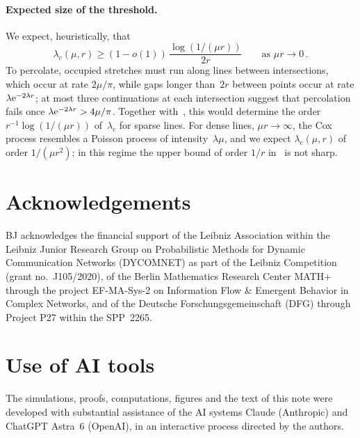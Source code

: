 \documentclass[11pt,letterpaper]{article}
\begin{document}
\paragraph{Expected size of the threshold.} We expect, heuristically, that
\begin{equation*}
  \lambda_c(\mu,r)\ge(1-o(1))\,\frac{\log(1/(\mu r))}{2r}\qquad\text{as }\mu r\to0\,.
\end{equation*} To percolate, occupied stretches must run along lines between intersections, which occur at rate $2\mu/\pi$, while gaps longer than~$2r$ between points occur at rate $\lambda\mathrm{e}^{-2\lambda r}$; at most three continuations at each intersection suggest that percolation fails once $\lambda\mathrm{e}^{-2\lambda r}>4\mu/\pi$. Together with~\cite[Theorem~2.1]{HJ26}, this would determine the order $r^{-1}\log(1/(\mu r))$ of~$\lambda_c$ for sparse lines. For dense lines, $\mu r\to\infty$, the Cox process resembles a Poisson process of intensity~$\lambda\mu$, and we expect $\lambda_c(\mu,r)$ of order $1/(\mu r^2)$; in this regime the upper bound of order $1/r$ in~\cite{HJ26} is not sharp.

\begin{samepage}
\section*{Acknowledgements}

BJ acknowledges the financial support of the Leibniz Association within the Leibniz Junior Research Group on Probabilistic Methods for Dynamic Communication Networks (DYCOMNET) as part of the Leibniz Competition (grant no.~J105/2020), of the Berlin Mathematics Research Center MATH+ through the project EF-MA-Sys-2 on Information Flow \& Emergent Behavior in Complex Networks, and of the Deutsche Forschungsgemeinschaft (DFG) through Project P27 within the SPP~2265.

\section*{Use of AI tools}

The simulations, proofs, computations, figures and the text of this note were developed with substantial assistance of the AI systems Claude (Anthropic) and ChatGPT Astra~6 (OpenAI), in an interactive process directed by the authors.

\end{samepage}



\end{document}

